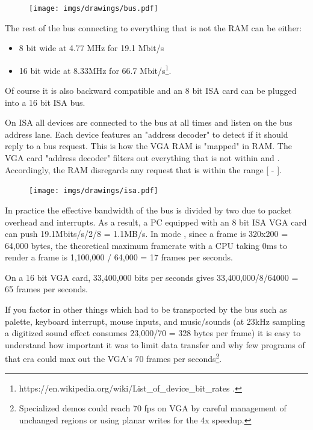 \documentclass[book.tex]{subfiles}
\begin{document}
\begin{figure}[H]
\centering
      \texttt{[image: imgs/drawings/bus.pdf]}
\end{figure}
\pagebreak
The rest of the bus connecting to everything that is not the RAM can be either:
\begin{itemize}
\item 8 bit wide at 4.77 MHz  for 19.1 Mbit/s
\item 16 bit wide at 8.33MHz for 66.7 Mbit/s\footnote{https://en.wikipedia.org/wiki/List\_of\_device\_bit\_rates .}.
\end{itemize}
Of course it is also backward compatible and an 8 bit ISA card can be plugged into a 16 bit ISA bus.\\
\par
\par
{} On ISA all devices are connected to the bus at all times and listen on the bus address lane. Each device features an "address decoder" to detect if it should reply to a bus request. This is how the VGA RAM is "mapped" in RAM. The VGA card "address decoder"  filters out everything that is not within  and . Accordingly, the RAM disregards any request that is within the range [ - ].\\
\par
 \begin{figure}[H]
\centering
\texttt{[image: imgs/drawings/isa.pdf]}
\end{figure}

\par
 In practice the effective bandwidth of the bus is divided by two due to packet overhead and interrupts. As a result, a PC equipped with an 8 bit ISA VGA card can push 19.1Mbits/s/2/8 = 1.1MB/s. In mode , since a frame is 320x200 = 64,000 bytes, the theoretical maximum framerate with a CPU taking 0ms to render a frame is 1,100,000 / 64,000 = 17 frames per seconds.\\
 \par
 On a 16 bit VGA card, 33,400,000 bits per seconds gives 33,400,000/8/64000 = 65 frames per seconds.\\
 \par
 If you factor in other things which had to be transported by the bus such as palette, keyboard interrupt, mouse inputs, and music/sounds (at 23kHz sampling a digitized sound effect consumes 23,000/70 = 328 bytes per frame) it is easy to understand how important it was to limit data transfer and why few programs of that era could max out the VGA's 70 frames per seconds\footnote{Specialized demos could reach 70 fps on VGA by careful management of unchanged regions or using planar writes for the 4x speedup.}.
\end{document}
